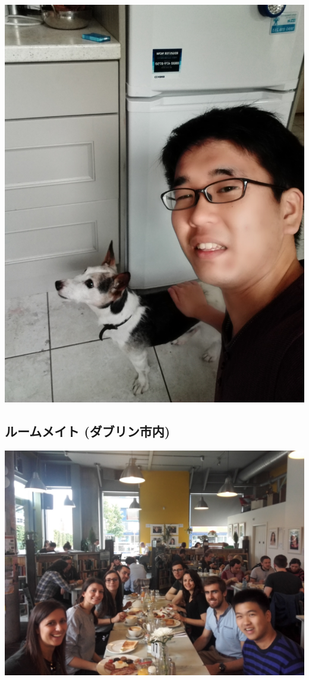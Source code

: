 \includegraphics{img/static/charlie.jpg}

\subsection{ルームメイト (ダブリン市内)}
\label{sec-7-5}

\includegraphics{img/static/roommates.jpg}

